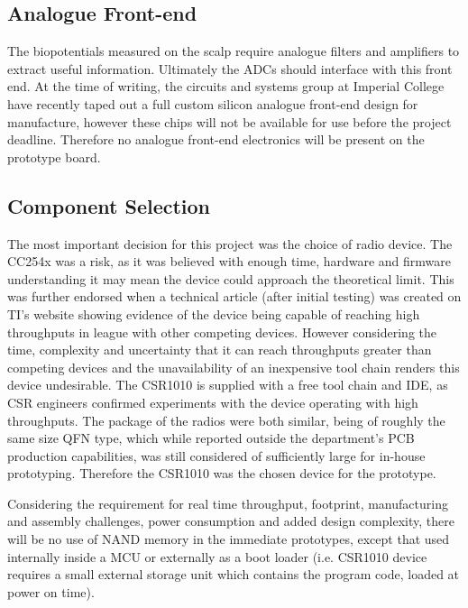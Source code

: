 \documentclass[]{article}
\begin{document}
\subsection{Analogue Front-end}

The biopotentials measured on the scalp require analogue filters and amplifiers to extract useful information. Ultimately the \ac{ADC}s should interface with this front end.  At the time of writing, the circuits and systems group at Imperial College have recently taped out a full custom silicon analogue front-end design for manufacture, however these chips will not be available for use before the project deadline. Therefore no analogue front-end electronics will be present on the prototype board.

\subsection{Component Selection}

The most important decision for this project was the choice of radio device. The CC254x was a risk, as it was believed with enough time, hardware and firmware understanding it may mean the device could approach the theoretical limit. This was further endorsed when a technical article (after initial testing) was created on \ac{TI}'s website \cite{overlapproc} showing evidence of the device being capable of reaching high throughputs in league with other competing devices. However considering the time, complexity and uncertainty that it can reach throughputs greater than competing devices and the unavailability of an inexpensive tool chain renders this device undesirable. The CSR1010 is supplied with a free tool chain and \ac{IDE}, as \ac{CSR} engineers confirmed experiments with the device operating with high throughputs. The package of the radios were both similar, being of roughly the same size \ac{QFN} type, which while reported outside the department's \ac{PCB} production capabilities, was still considered of sufficiently large for in-house prototyping. Therefore the CSR1010 was the chosen device for the prototype.

Considering the requirement for real time throughput, footprint, manufacturing and assembly challenges, power consumption and added design complexity, there will be no use of NAND memory in the immediate prototypes, except that used internally inside a \ac{MCU} or externally as a boot loader (i.e. CSR1010 device requires a small external storage unit which contains the program code, loaded at power on time).
\end{document}
